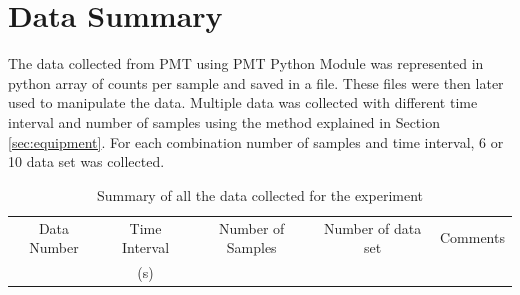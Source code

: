 \documentclass[a4paper,12pt]{article}
\begin{document}
\section{Data Summary}
\label{sec:data}

The data collected from PMT using PMT Python Module was represented in python array of counts per sample and saved in a file. These files were then later used to manipulate the data. Multiple data was collected with different time interval and number of samples using the method explained in Section \ref{sec:equipment}. For each combination number of samples and time interval, 6 or 10 data set was collected. 


\begin{table}[H]
\centering %
\caption{Summary of all the data collected for the experiment}
\footnotesize

\begin{tabular}{ccccc}%
\hline
\hline

Data Number  & Time Interval & Number of Samples & Number of data set & Comments \\
& (s) & & &\\


\end{tabular}
\end{table}
\end{document}
